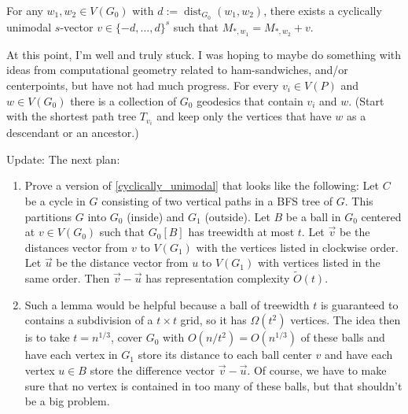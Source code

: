 \documentclass{patmorin}
\DeclareMathOperator{\dist}{dist}
\begin{document}
%

\begin{lem}\label{cyclically_unimodal}
    For any $w_1,w_2\in V(G_0)$ with $d:=\dist_{G_0}(w_1,w_2)$, there exists a cyclically unimodal $s$-vector $v\in\{-d,\ldots,d\}^s$ such that $M_{*,w_1}=M_{*,w_2}+v$.
\end{lem}

At this point, I'm well and truly stuck.  I was hoping to maybe do something with ideas from computational geometry related to ham-sandwiches, and/or centerpoints, but have not had much progress. For every $v_i\in V(P)$ and $w\in V(G_0)$ there is a collection of $G_0$ geodesics that contain $v_i$ and $w$.  (Start with the shortest path tree  $T_{v_i}$ and keep only the vertices that have $w$ as a descendant or an ancestor.)

Update: The next plan:
\begin{enumerate}
    \item Prove a version of \cref{cyclically_unimodal} that looks like the following:  Let $C$ be a cycle in $G$ consisting of two vertical paths in a BFS tree of $G$.  This partitions $G$ into $G_0$ (inside) and $G_1$ (outside).  Let $B$ be a ball in $G_0$ centered at $v\in V(G_0)$ such that $G_0[B]$ has treewidth at most $t$.  Let $\vec{v}$ be the distances vector from $v$ to $V(G_1)$ with the vertices listed in clockwise order.  Let $\vec{u}$ be the distance vector from $u$ to $V(G_1)$ with vertices listed in the same order.  Then $\vec{v}-\vec{u}$ has representation complexity $\tilde{O}(t)$.

    \item Such a lemma would be helpful because a ball of treewidth $t$ is guaranteed to contains a subdivision of a $t\times t$ grid, so it has $\Omega(t^2)$ vertices.  The idea then is to take $t=n^{1/3}$, cover $G_0$ with $O(n/t^2)=O(n^{1/3})$ of these balls and have each vertex in $G_1$ store its distance to each ball center $v$ and have each vertex $u\in B$ store the difference vector $\vec{v}-\vec{u}$.  Of course, we have to make sure that no vertex is contained in too many of these balls, but that shouldn't be a big problem.
\end{enumerate}
\end{document}
